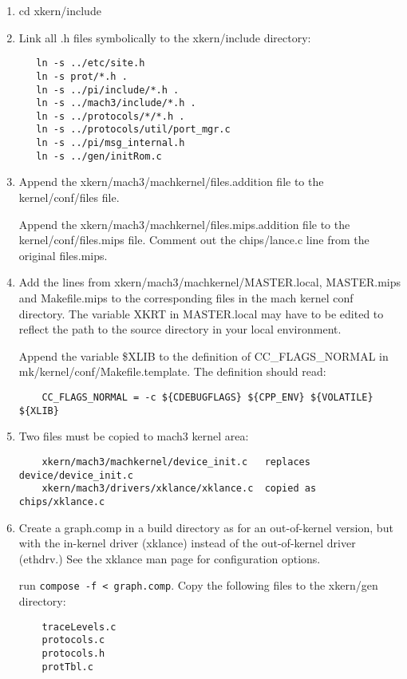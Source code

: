 \begin{enumerate}
\item cd xkern/include

\item Link all .h files symbolically to the xkern/include directory:

\begin{verbatim}
   ln -s ../etc/site.h
   ln -s prot/*.h .
   ln -s ../pi/include/*.h .
   ln -s ../mach3/include/*.h .
   ln -s ../protocols/*/*.h .
   ln -s ../protocols/util/port_mgr.c
   ln -s ../pi/msg_internal.h
   ln -s ../gen/initRom.c
\end{verbatim}

\item Append the xkern/mach3/machkernel/files.addition file to the
   kernel/conf/files file.

   Append the xkern/mach3/machkernel/files.mips.addition file to the
   kernel/conf/files.mips file.  Comment out the chips/lance.c line from
   the original files.mips.

\item Add the lines from xkern/mach3/machkernel/MASTER.local, MASTER.mips
   and Makefile.mips to the corresponding files in the mach kernel conf
   directory.  The variable XKRT in MASTER.local may have to be edited
   to reflect the path to the \xk{} source directory in your local
   environment.

   Append the variable \${XLIB} to the definition of CC\_FLAGS\_NORMAL in
   mk/kernel/conf/Makefile.template.  The definition should read:
\begin{verbatim}
	CC_FLAGS_NORMAL = -c ${CDEBUGFLAGS} ${CPP_ENV} ${VOLATILE} ${XLIB}
\end{verbatim}


\item Two files must be copied to mach3 kernel area:
\begin{verbatim}
	xkern/mach3/machkernel/device_init.c   replaces   device/device_init.c
	xkern/mach3/drivers/xklance/xklance.c  copied as  chips/xklance.c
\end{verbatim}

\item Create a graph.comp in a build directory as for an out-of-kernel
   version, but with the in-kernel driver (xklance) instead of the
   out-of-kernel driver (ethdrv.)  See the xklance man page for
   configuration options.

   run {\tt compose -f < graph.comp}. Copy the following files to the 
   xkern/gen directory:
\begin{verbatim}
	traceLevels.c
	protocols.c
	protocols.h
	protTbl.c
\end{verbatim}


\end{enumerate}
